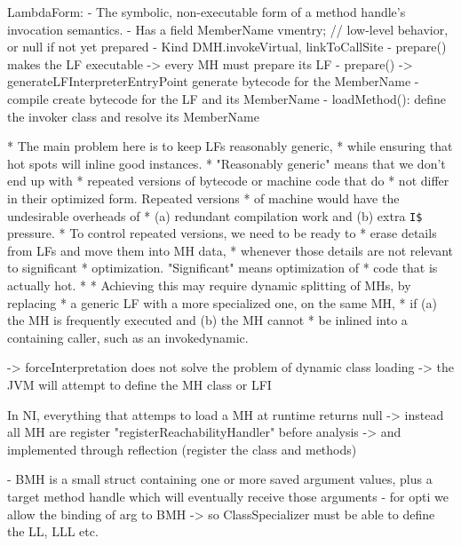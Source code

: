 LambdaForm: 
- The symbolic, non-executable form of a method handle's invocation semantics.
- Has a field MemberName vmentry;   // low-level behavior, or null if not yet prepared
- Kind DMH.invokeVirtual, linkToCallSite
- prepare() makes the LF executable -> every MH must prepare its LF
- prepare() -> generateLFInterpreterEntryPoint generate bytecode for the MemberName
- compile create bytecode for the LF and its MemberName
- loadMethod(): define the invoker class and resolve its MemberName

     * The main problem here is to keep LFs reasonably generic,
     * while ensuring that hot spots will inline good instances.
     * "Reasonably generic" means that we don't end up with
     * repeated versions of bytecode or machine code that do
     * not differ in their optimized form.  Repeated versions
     * of machine would have the undesirable overheads of
     * (a) redundant compilation work and (b) extra \verb|I$| pressure.
     * To control repeated versions, we need to be ready to
     * erase details from LFs and move them into MH data,
     * whenever those details are not relevant to significant
     * optimization.  "Significant" means optimization of
     * code that is actually hot.
     *
     * Achieving this may require dynamic splitting of MHs, by replacing
     * a generic LF with a more specialized one, on the same MH,
     * if (a) the MH is frequently executed and (b) the MH cannot
     * be inlined into a containing caller, such as an invokedynamic.


-> forceInterpretation does not solve the problem of dynamic class loading -> the JVM will attempt to define the MH class or LFI

In NI, everything that attemps to load a MH at runtime returns null -> instead all MH are register "registerReachabilityHandler" before analysis
-> and implemented through reflection (register the class and methods)



- BMH is a small struct containing one or more saved argument values, plus a target method handle which will eventually receive those arguments
- for opti we allow the binding of arg to BMH -> so ClassSpecializer must be able to define the LL, LLL etc.